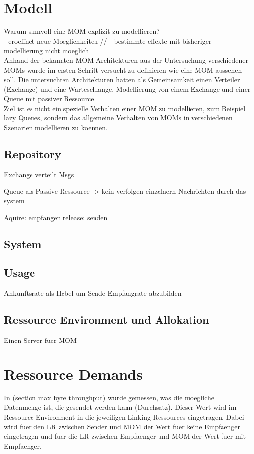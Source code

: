 \section{Modell}
Warum sinnvoll eine MOM explizit zu modellieren? \\
- eroeffnet neue Moeglichkeiten //
- bestimmte effekte mit bisheriger modellierung nicht moeglich\\
Anhand der bekannten MOM Architekturen aus der Untersuchung verschiedener MOMs wurde im ersten Schritt versucht zu definieren wie eine MOM aussehen soll. Die untersuchten Architekturen hatten als Gemeinsamkeit einen Verteiler (Exchange) und eine Warteschlange. Modellierung von einem Exchange und einer Queue mit passiver Ressource
\\
Ziel ist es nicht ein spezielle Verhalten einer MOM zu modellieren, zum Beispiel lazy Queues, sondern das allgemeine Verhalten von MOMs in verschiedenen Szenarien modellieren zu koennen.
\subsection{Repository}
Exchange verteilt Msgs

Queue als Passive Ressource -> kein verfolgen einzelnern Nachrichten durch das system

Aquire: empfangen
release: senden

\subsection{System}

\subsection{Usage}
Ankunftsrate als Hebel um Sende-Empfangrate abzubilden
\subsection{Ressource Environment und Allokation}
Einen Server fuer MOM

\section{Ressource Demands}
In (section max byte throughput) wurde gemessen, was die moegliche Datenmenge ist, die gesendet werden kann (Durchsatz). Dieser Wert wird im Ressource Environment in die jeweiligen Linking Ressources eingetragen. Dabei wird fuer den LR zwischen Sender und MOM der Wert fuer keine Empfaenger eingetragen und fuer die LR zwischen Empfaenger und MOM der Wert fuer mit Empfaenger. \\

